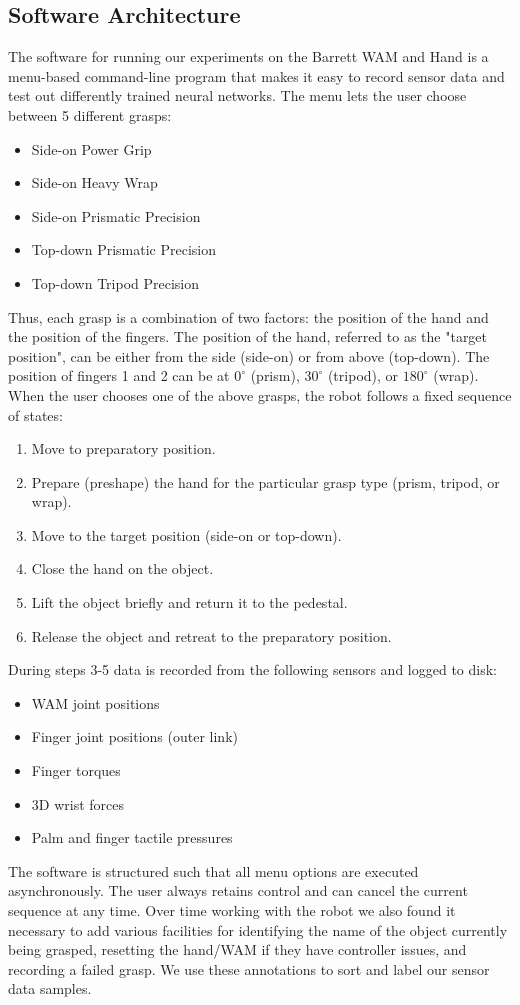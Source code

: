 \documentclass[12pt, oneside]{article}
\begin{document}
\subsection{Software Architecture}
The software for running our experiments on the Barrett WAM and Hand is a menu-based command-line program that makes it easy to record sensor data and test out differently trained neural networks. The menu lets the user choose between 5 different grasps:
\begin{itemize}
\item Side-on Power Grip
\item Side-on Heavy Wrap
\item Side-on Prismatic Precision
\item Top-down Prismatic Precision
\item Top-down Tripod Precision
\end{itemize}
Thus, each grasp is a combination of two factors: the position of the hand and the position of the fingers. The position of the hand, referred to as the "target position", can be either from the side (side-on) or from above (top-down). The position of fingers 1 and 2 can be at $0^\circ$ (prism), $30^\circ$ (tripod), or $180^\circ$ (wrap). When the user chooses one of the above grasps, the robot follows a fixed sequence of states:
\begin{enumerate}
\item Move to preparatory position.
\item Prepare (preshape) the hand for the particular grasp type (prism, tripod, or wrap).
\item Move to the target position (side-on or top-down).
\item Close the hand on the object.
\item Lift the object briefly and return it to the pedestal.
\item Release the object and retreat to the preparatory position.
\end{enumerate}
During steps 3-5 data is recorded from the following sensors and logged to disk:
\begin{itemize}
\item WAM joint positions
\item Finger joint positions (outer link)
\item Finger torques
\item 3D wrist forces
\item Palm and finger tactile pressures
\end{itemize}
The software is structured such that all menu options are executed asynchronously. The user always retains control and can cancel the current sequence at any time. Over time working with the robot we also found it necessary to add various facilities for identifying the name of the object currently being grasped, resetting the hand/WAM if they have controller issues, and recording a failed grasp. We use these annotations to sort and label our sensor data samples.
\end{document}

